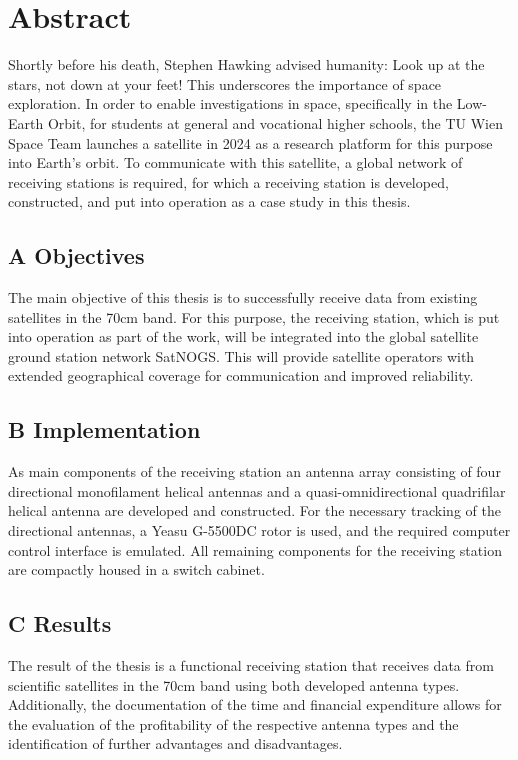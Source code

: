 \section*{Abstract}
\label{chap:abstr}
Shortly before his death, Stephen Hawking advised humanity: \glqq Look up at the stars, not down at your feet!\grqq{} This underscores the importance of space exploration. In order to enable investigations in space, specifically in the Low-Earth Orbit, for students at general and vocational higher schools, the TU Wien Space Team launches a satellite in 2024 as a research platform for this purpose into Earth's orbit. To communicate with this satellite, a global network of receiving stations is required, for which a receiving station is developed, constructed, and put into operation as a case study in this thesis.

\subsection*{A Objectives}
The main objective of this thesis is to successfully receive data from existing satellites in the 70cm band. For this purpose, the receiving station, which is put into operation as part of the work, will be integrated into the global satellite ground station network SatNOGS. This will provide satellite operators with extended geographical coverage for communication and improved reliability.

\subsection*{B Implementation}
As main components of the receiving station an antenna array consisting of four directional monofilament helical antennas and a quasi-omnidirectional quadrifilar helical antenna are developed and constructed. For the necessary tracking of the directional antennas, a Yeasu G-5500DC rotor is used, and the required computer control interface is emulated. All remaining components for the receiving station are compactly housed in a switch cabinet.

\subsection*{C Results}
The result of the thesis is a functional receiving station that receives data from scientific satellites in the 70cm band using both developed antenna types. Additionally, the documentation of the time and financial expenditure allows for the evaluation of the profitability of the respective antenna types and the identification of further advantages and disadvantages.